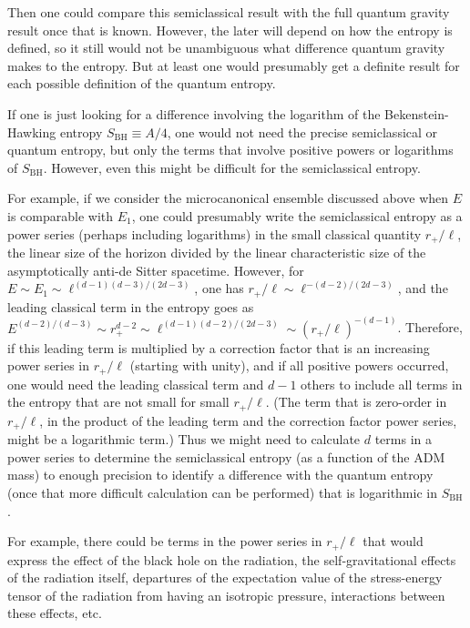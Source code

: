 \documentclass[12pt]{article} \usepackage{latexsym} \textwidth 15cm
\begin{document}
Then one could compare this semiclassical result with the full quantum
gravity result once that is known.  However, the later will depend on
how the entropy is defined, so it still would not be unambiguous what
difference quantum gravity makes to the entropy.  But at least one
would presumably get a definite result for each possible definition of
the quantum entropy.

If one is just looking for a difference involving the logarithm of the
Bekenstein-Hawking entropy $S_{\mathrm{BH}} \equiv A/4$, one would not
need the precise semiclassical or quantum entropy, but only the terms
that involve positive powers or logarithms of $S_{\mathrm{BH}}$. 
However, even this might be difficult for the semiclassical entropy.

For example, if we consider the microcanonical ensemble discussed above
when $E$ is comparable with $E_1$, one could presumably write the
semiclassical entropy as a power series (perhaps including logarithms)
in the small classical quantity $r_+/\ell$, the linear size of the
horizon divided by the linear characteristic size of the asymptotically
anti-de Sitter spacetime.  However, for $E \sim E_1 \sim
\ell^{(d-1)(d-3)/(2d-3)}$, one has $r_+/\ell \sim
\ell^{-(d-2)/(2d-3)}$, and the leading classical term in the entropy
goes as $E^{(d-2)/(d-3)} \sim r_+^{d-2} \sim \ell^{(d-1)(d-2)/(2d-3)}
\sim (r_+/\ell)^{-(d-1)}$.  Therefore, if this leading term is
multiplied by a correction factor that is an increasing power series in
$r_+/\ell$ (starting with unity), and if all positive powers occurred,
one would need the leading classical term and $d-1$ others to include
all terms in the entropy that are not small for small $r_+/\ell$.  (The
term that is zero-order in $r_+/\ell$, in the product of the leading
term and the correction factor power series, might be a logarithmic
term.)  Thus we might need to calculate $d$ terms in a power series to
determine the semiclassical entropy (as a function of the ADM mass) to
enough precision to identify a difference with the quantum entropy
(once that more difficult calculation can be performed) that is
logarithmic in $S_{\mathrm{BH}}$.

For example, there could be terms in the power series in $r_+/\ell$
that would express the effect of the black hole on the radiation, the
self-gravitational effects of the radiation itself, departures of the
expectation value of the stress-energy tensor of the radiation from
having an isotropic pressure, interactions between these effects, etc.
\end{document}
